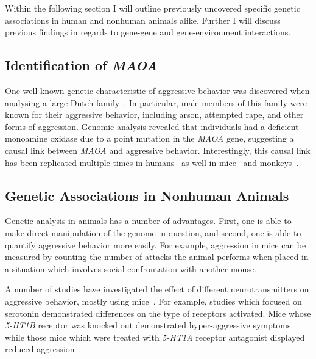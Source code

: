 Within the following section I will outline previously uncovered specific genetic associations in human and nonhuman animals alike.
Further I will discuss previous findings in regards to gene-gene and gene-environment interactions.





\subsection{Identification of \textit{MAOA}}
\label{sub:identification_of_MAOA}

One well known genetic characteristic of aggressive behavior was discovered when analysing a large Dutch family~\cite{Brunner1993}.
In particular, male members of this family were known for their aggressive behavior, including arson, attempted rape, and other forms of aggression.
Genomic analysis revealed that individuals had a deficient monoamine oxidase due to a point mutation in the \textit{MAOA} gene, suggesting a causal link between \textit{MAOA} and aggressive behavior.
Interestingly, this causal link has been replicated multiple times in humans~\cite{Huang2004,Manuck2000} as well in mice~\cite{Cases1995} and monkeys~\cite{Newman2005}.

\subsection{Genetic Associations in Nonhuman Animals}
\label{sub:genetic_associations_in_animals}

Genetic analysis in animals has a number of advantages.
First, one is able to make direct manipulation of the genome in question, and second, one is able to quantify aggressive behavior more easily.
For example, aggression in mice can be measured by counting the number of attacks the animal performs when placed in a situation which involves social confrontation with another mouse.

A number of studies have investigated the effect of different neurotransmitters on aggressive behavior, mostly using mice~\cite{Anholt2012}.
For example, studies which focused on serotonin demonstrated differences on the type of receptors activated.
Mice whose \textit{5-HT1B} receptor was knocked out demonstrated hyper-aggressive symptoms while those mice which were treated with \textit{5-HT1A} receptor antagonist displayed reduced aggression~\cite{Saudou1994,Bell1994}.

